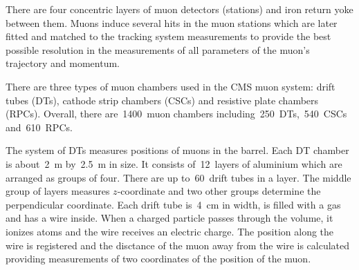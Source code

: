 There are four concentric layers of muon detectors (stations) and iron return yoke between them. Muons induce several hits in the muon stations which are later fitted and matched to the tracking system measurements to provide the best possible resolution in the measurements of all parameters of the muon's trajectory and momentum.

There are three types of muon chambers used in the CMS muon system: drift tubes (DTs), cathode strip chambers (CSCs) and resistive plate chambers (RPCs). Overall, there are~1400~muon chambers including~250~DTs,~540~CSCs and~610~RPCs.

The system of DTs measures positions of muons in the barrel. Each DT chamber is about~2~m by~2.5~m in size. It consists of~12~layers of aluminium which are arranged as groups of four. There are up to~60~drift tubes in a layer. The middle group of layers measures $z$-coordinate and two other groups determine the perpendicular coordinate. Each drift tube is~4~cm in width, is filled with a gas and has a wire inside. When a charged particle passes through the volume, it ionizes atoms and the wire receives an electric charge. The position along the wire is registered and the disctance of the muon away from the wire is calculated providing measurements of two coordinates of the position of the muon.


